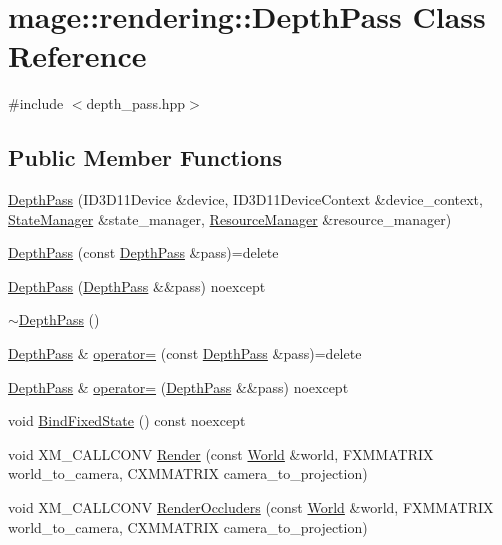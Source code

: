 \hypertarget{classmage_1_1rendering_1_1_depth_pass}{}\section{mage\+:\+:rendering\+:\+:Depth\+Pass Class Reference}
\label{classmage_1_1rendering_1_1_depth_pass}


{\ttfamily \#include $<$depth\+\_\+pass.\+hpp$>$}

\subsection*{Public Member Functions}
\begin{DoxyCompactItemize}
\item 
\hyperlink{classmage_1_1rendering_1_1_depth_pass_a0be584f68a1a6b4d3b63616c449e903d}{Depth\+Pass} (I\+D3\+D11\+Device \&device, I\+D3\+D11\+Device\+Context \&device\+\_\+context, \hyperlink{classmage_1_1rendering_1_1_state_manager}{State\+Manager} \&state\+\_\+manager, \hyperlink{classmage_1_1rendering_1_1_resource_manager}{Resource\+Manager} \&resource\+\_\+manager)
\item 
\hyperlink{classmage_1_1rendering_1_1_depth_pass_aea4f5634f65a8f5181b73e9817d499db}{Depth\+Pass} (const \hyperlink{classmage_1_1rendering_1_1_depth_pass}{Depth\+Pass} \&pass)=delete
\item 
\hyperlink{classmage_1_1rendering_1_1_depth_pass_a7157b0a6480a1fca6001e4eb93b4e5fd}{Depth\+Pass} (\hyperlink{classmage_1_1rendering_1_1_depth_pass}{Depth\+Pass} \&\&pass) noexcept
\item 
\hyperlink{classmage_1_1rendering_1_1_depth_pass_a5ad944e2a8f93e2f4bf5f9f97641e003}{$\sim$\+Depth\+Pass} ()
\item 
\hyperlink{classmage_1_1rendering_1_1_depth_pass}{Depth\+Pass} \& \hyperlink{classmage_1_1rendering_1_1_depth_pass_a10cc86e94eb5425f0323b989c33514b7}{operator=} (const \hyperlink{classmage_1_1rendering_1_1_depth_pass}{Depth\+Pass} \&pass)=delete
\item 
\hyperlink{classmage_1_1rendering_1_1_depth_pass}{Depth\+Pass} \& \hyperlink{classmage_1_1rendering_1_1_depth_pass_a937bc6669a2bd856e7ff9c396e0afe77}{operator=} (\hyperlink{classmage_1_1rendering_1_1_depth_pass}{Depth\+Pass} \&\&pass) noexcept
\item 
void \hyperlink{classmage_1_1rendering_1_1_depth_pass_a0123d8dbf23e7909dbb22e9bc37785a1}{Bind\+Fixed\+State} () const noexcept
\item 
void X\+M\+\_\+\+C\+A\+L\+L\+C\+O\+NV \hyperlink{classmage_1_1rendering_1_1_depth_pass_a8f7b040d49cb8b7a39ae28183073df0e}{Render} (const \hyperlink{classmage_1_1rendering_1_1_world}{World} \&world, F\+X\+M\+M\+A\+T\+R\+IX world\+\_\+to\+\_\+camera, C\+X\+M\+M\+A\+T\+R\+IX camera\+\_\+to\+\_\+projection)
\item 
void X\+M\+\_\+\+C\+A\+L\+L\+C\+O\+NV \hyperlink{classmage_1_1rendering_1_1_depth_pass_a8369c20dc33152471fa2bd5204a2615c}{Render\+Occluders} (const \hyperlink{classmage_1_1rendering_1_1_world}{World} \&world, F\+X\+M\+M\+A\+T\+R\+IX world\+\_\+to\+\_\+camera, C\+X\+M\+M\+A\+T\+R\+IX camera\+\_\+to\+\_\+projection)
\end{DoxyCompactItemize}
